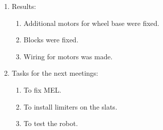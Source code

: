 \begin{enumerate}
\begin{enumerate}
	\end{enumerate}
	
	\item Results:
	\begin{enumerate}
		
		\item Additional motors for wheel base were fixed.
		
		\item Blocks were fixed.
		
        \item Wiring for motors was made.
		
	\end{enumerate}
	
	\item Tasks for the next meetings:
	\begin{enumerate}
		
		\item To fix MEL.
		
		\item To install limiters on the slats.
		
        \item To test the robot.
			
	\end{enumerate}
\end{enumerate}
\fillpage
